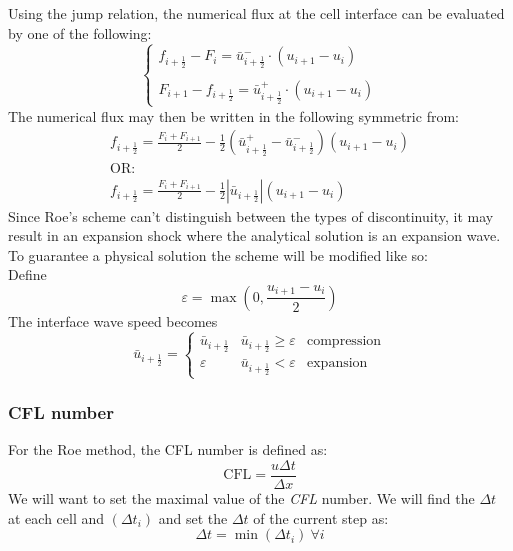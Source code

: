 \documentclass[11pt, a4paper]{article}
\begin{document}
Using the jump relation, the numerical flux at the cell interface can be evaluated by one of the following:
\begin{equation}
    \left\{\begin{array}{l}
        f_{i+\frac{1}{2}}-F_i = \bar{u}_{i+\frac{1}{2}}^-\cdot\left(u_{i+1}-u_i\right) \\\\
        F_{i+1}-f_{i+\frac{1}{2}}=\bar{u}_{i+\frac{1}{2}}^+\cdot\left(u_{i+1}-u_i\right)
    \end{array}\right.
\end{equation}
The numerical flux may then be written in the following symmetric from:
\begin{equation}
    \begin{array}{l}
        \displaystyle f_{i+\frac{1}{2}}=\frac{F_i+F_{i+1}}{2}-\frac{1}{2}\left(\bar{u}_{i+\frac{1}{2}}^+-\bar{u}_{i+\frac{1}{2}}^-\right)\left(u_{i+1}-u_i\right) \\
        \mathrm{OR:} \\
        \displaystyle f_{i+\frac{1}{2}}=\frac{F_i+F_{i+1}}{2}-\frac{1}{2}\left|\bar{u}_{i+\frac{1}{2}}\right|\left(u_{i+1}-u_i\right)
    \end{array}
\end{equation}
Since Roe's scheme can't distinguish between the types of discontinuity, it may result in an expansion shock where the analytical solution is an expansion wave. To guarantee a physical solution the scheme will be modified like so:\\
Define 
\begin{equation*}
    \varepsilon=\max\left(0,\frac{u_{i+1}-u_i}{2}\right)
\end{equation*}
The interface wave speed becomes
\begin{equation}
    \bar{u}_{i+\frac{1}{2}}=\left\{\begin{array}{ccc}
        \bar{u}_{i+\frac{1}{2}} & \bar{u}_{i+\frac{1}{2}}\geq\varepsilon & \mathrm{compression} \\
        \varepsilon & \bar{u}_{i+\frac{1}{2}}<\varepsilon & \mathrm{expansion}
    \end{array}\right.
\end{equation}

\subsubsection{CFL number}
For the Roe method, the CFL number is defined as:
\begin{equation}
    \mathrm{CFL}=\frac{u\Delta t}{\Delta x}
\end{equation}
We will want to set the maximal value of the \emph{CFL} number. We will find the $\Delta t$ at each cell and $\left(\Delta t_i\right)$ and set the $\Delta t$ of the current step as:
\begin{equation}
    \Delta t=\min\left(\Delta t_i\right)\ \forall i
\end{equation}
\end{document}
